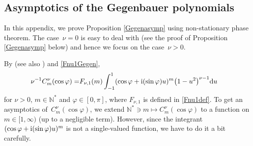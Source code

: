 \documentclass[10pt,a4paper]{amsart}
\numberwithin{equation}{section}
\def\f{\varphi}
\def\n{\nu}
\begin{document}
\subsection{Asymptotics of the Gegenbauer polynomials}\label{appasymgegensubsec}

In this appendix, we prove Proposition \ref{Gegenasymp} using non-stationary phase theorem. The case~${\n=0}$ is easy to deal with (see the proof of Proposition \ref{Gegenasymp} below) and hence we focus on the case~${\n>0}$.

By \cite[equation~(4.30)]{BKO} (see also \cite[Section 10]{IJ}) and \eqref{Fnu1Gegen},
\begin{align}\label{Gegenintrep}
\n^{-1}C_m^{\n}(\cos\f)=&F_{\n,1}(m)\int_{-1}^{1}(\cos\f+{\rm i}(\sin\f)u)^m\bigl(1-u^2\bigr)^{\n-1}{\rm d}u
\end{align}
for $\n>0$, $m\in\mathbb{N}^*$ and $\f\in [0,\pi]$, where $F_{\n,1}$ is defined in \eqref{Fnu1def}. To get an asymptotics of~$C_m^{\n}(\cos\f)$, we extend $\mathbb{N}^*\ni m\mapsto C_m^{\n}(\cos\f)$ to a function on $m\in [1,\infty)$ (up to a negligible term). However, since the integrant $(\cos\f+{\rm i}(\sin\f)u)^m$ is not a single-valued function, we have to do it a bit carefully.
\end{document}
